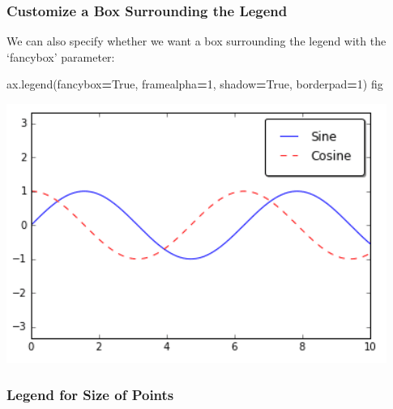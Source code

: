 \documentclass[]{book}
\newenvironment{Shaded}{\begin{snugshade}}{\end{snugshade}}
\newcommand{\DecValTok}[1]{\textcolor[rgb]{0.00,0.00,0.81}{#1}}
\newcommand{\NormalTok}[1]{#1}
\newcommand{\OperatorTok}[1]{\textcolor[rgb]{0.81,0.36,0.00}{\textbf{#1}}}
\newcommand{\VariableTok}[1]{\textcolor[rgb]{0.00,0.00,0.00}{#1}}
\begin{document}
\hypertarget{customize-a-box-surrounding-the-legend}{%
\subsubsection{Customize a Box Surrounding the Legend}\label{customize-a-box-surrounding-the-legend}}

We can also specify whether we want a box surrounding the legend with the `fancybox' parameter:

\begin{Shaded}
\begin{Highlighting}[]
\NormalTok{ax.legend(fancybox}\OperatorTok{=}\VariableTok{True}\NormalTok{, framealpha}\OperatorTok{=}\DecValTok{1}\NormalTok{, shadow}\OperatorTok{=}\VariableTok{True}\NormalTok{, borderpad}\OperatorTok{=}\DecValTok{1}\NormalTok{)}
\NormalTok{fig}
\end{Highlighting}
\end{Shaded}

\includegraphics{images/legend3.png}

\hypertarget{legend-for-size-of-points}{%
\subsubsection{Legend for Size of Points}\label{legend-for-size-of-points}}
\end{document}
